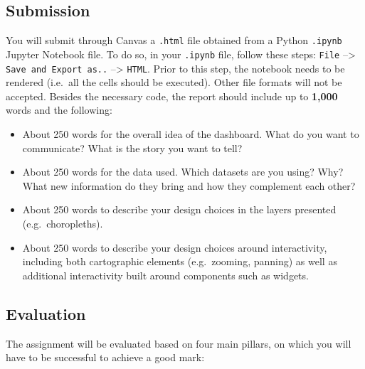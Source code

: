 \documentclass[
  letterpaper,
  DIV=11,
  numbers=noendperiod]{scrreprt}
\providecommand{\tightlist}{%
  \setlength{\itemsep}{0pt}\setlength{\parskip}{0pt}}\usepackage{longtable,booktabs,array}
\begin{document}
\subsection*{Submission}\label{submission-1}

You will submit through Canvas a \texttt{.html} file obtained from a
Python \texttt{.ipynb} Jupyter Notebook file. To do so, in your
\texttt{.ipynb} file, follow these steps: \texttt{File} --\textgreater{}
\texttt{Save\ and\ Export\ as..} --\textgreater{} \texttt{HTML}. Prior
to this step, the notebook needs to be rendered (i.e.~all the cells
should be executed). Other file formats will not be accepted. Besides
the necessary code, the report should include up to \textbf{1,000} words
and the following:

\begin{itemize}
\tightlist
\item
  About 250 words for the overall idea of the dashboard. What do you
  want to communicate? What is the story you want to tell?
\item
  About 250 words for the data used. Which datasets are you using? Why?
  What new information do they bring and how they complement each other?
\item
  About 250 words to describe your design choices in the layers
  presented (e.g.~choropleths).
\item
  About 250 words to describe your design choices around interactivity,
  including both cartographic elements (e.g.~zooming, panning) as well
  as additional interactivity built around components such as widgets.
\end{itemize}

\subsection*{Evaluation}\label{evaluation}

The assignment will be evaluated based on four main pillars, on which
you will have to be successful to achieve a good mark:
\end{document}
